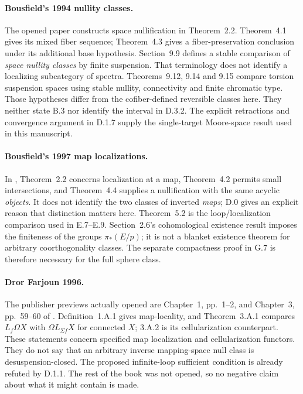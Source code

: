 \paragraph{Bousfield's 1994 nullity classes.}
The opened paper \cite{JBousfield1994} constructs space nullification in
Theorem~2.2. Theorem~4.1 gives its mixed fiber sequence; Theorem~4.3 gives
a fiber-preservation conclusion under its additional base hypothesis.
Section~9.9 defines a stable comparison of \emph{space nullity classes} by
finite suspension. That terminology does not identify a localizing
subcategory of spectra. Theorems~9.12, 9.14 and 9.15 compare torsion
suspension spaces using stable nullity, connectivity and finite chromatic
type. Those hypotheses differ from the cofiber-defined reversible classes
here. They neither state B.3 nor identify the interval in D.3.2.
The explicit retractions and convergence argument in D.1.7 supply the
single-target Moore-space result used in this manuscript.

\paragraph{Bousfield's 1997 map localizations.}
In \cite{EH5Bousfield1997}, Theorem~2.2 concerns localization at a map,
Theorem~4.2 permits small intersections, and Theorem~4.4 supplies a
nullification with the same acyclic \emph{objects}. It does not identify
the two classes of inverted \emph{maps}; D.0 gives an explicit reason that
distinction matters here. Theorem~5.2 is the loop/localization comparison
used in E.7--E.9. Section~2.6's cohomological existence result imposes the
finiteness of the groups $\pi_*(E/p)$; it is not a blanket existence theorem
for arbitrary coorthogonality classes. The separate compactness proof in
G.7 is therefore necessary for the full sphere class.

\paragraph{Dror Farjoun 1996.}
The publisher previews actually opened are Chapter~1, pp.~1--2, and
Chapter~3, pp.~59--60 of \cite{JFarjoun1996}. Definition~1.A.1 gives
map-locality, and Theorem~3.A.1 compares $L_f\Omega X$ with
$\Omega L_{\Sigma f}X$ for connected $X$; 3.A.2 is its cellularization
counterpart. These statements concern specified map localization and
cellularization functors. They do not say that an arbitrary inverse
mapping-space null class is desuspension-closed. The proposed
infinite-loop sufficient condition is already refuted by D.1.1.
The rest of the book was not opened, so no negative claim about what it
might contain is made.

